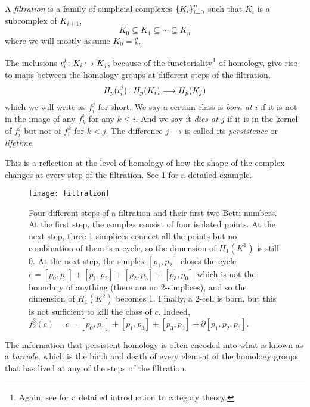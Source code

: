 \documentclass[../main.tex]{subfiles}
\begin{document}
\begin{definition}[Filtration]
	A \emph{filtration} is a family of simplicial complexes \( \left\{ K_i \right\}_{i = 0}^n \)	such
	that \( K_i \) is a subcomplex of \( K_{i+1} \),
	\begin{equation*}
		K_0 \subseteq K_1 \subseteq \cdots \subseteq K_n
	\end{equation*}
	where we will mostly assume \( K_0 = \emptyset \). 
\end{definition}
The inclusions \( \iota_i^j \colon K_i \hookrightarrow K_j \), because of the
functoriality\footnote{Again, see \cite{riehl} for a detailed introduction to category
theory.} of homology, give rise to maps between the homology groups at different steps of
the filtration,
\begin{equation*}
	H_p(\iota_i^j) \colon H_p(K_i) \longrightarrow H_p(K_j)
\end{equation*}
which we will write as \( f_i^j \) for short. We say a certain class is \emph{born at \( i
\)} if it is not in the image of any \( f_k^i \) for any \( k \leq i \). And we say it
\emph{dies at \( j \)} if it is in the kernel of \( f_i^j \) but not of \( f_i^k \) for \(
k < j \). The difference \( j - i \) is called its \emph{persistence} or \emph{lifetime}. 

This is a reflection at the level of homology of how the shape of the complex changes at
every step of the filtration. See \cref{fig:filtration} for a detailed example.
\begin{figure}[htb]
	\centering
	\texttt{[image: filtration]}
	\caption{Four different steps of a filtration and their first two Betti numbers. At the
		first step, the complex consist of four isolated points. At the next step, three
		1-simplices connect all the points but no combination of them is a cycle, so the dimension
		of \( H_1(K^1) \) is still 0. At the next step, the simplex \( [p_1,p_2] \) closes the
		cycle \( c = [p_0,p_1] + [p_1,p_2] + [p_2,p_3] + [p_3,p_0] \)	which is not the boundary of
		anything (there are no 2-simplices), and so the dimension of \( H_1(K^2) \) becomes 1.
		Finally, a 2-cell is born, but this is not sufficient to kill the class of \( c \).
	Indeed, \( f_2^3(c) = c = [p_0,p_1] + [p_1,p_3] + [p_3,p_0] + \partial[p_1,p_2,p_3] \).}
	\label{fig:filtration}
\end{figure}
The information that persistent homology is often encoded into what is known as a
\emph{barcode}, which is the birth and death of every element of the homology groups that
has lived at any of the steps of the filtration. 
\end{document}
